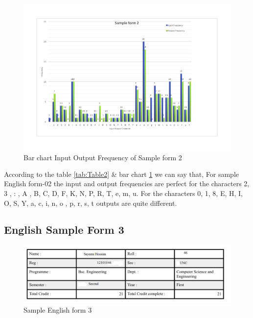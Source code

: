 \begin{figure}[H]
\centering
\includegraphics[width=1\textwidth]{form2.pdf}
\caption {Bar chart Input Output Frequency of Sample form 2}
\label {fig:bar2}
\end{figure}
According to the table \ref{tab:Table2} \& bar chart \ref{fig:bar2} we can say that, For sample English form-02 the input and output frequencies are perfect for the characters 2, 3 , :  , A , B, C, D, F, K, N, P, R, T, e, m, u. For the characters 0, 1, 8, E, H, I, O, S, Y, a, c, i, n, o , p, r, s, t outputs are quite different. 
\subsection{English Sample Form 3}

\begin{figure}[H]
\centering
\includegraphics[width=1\textwidth]{form3.png}
\caption {Sample English form 3}
\label {fig:form3}
\end{figure}


